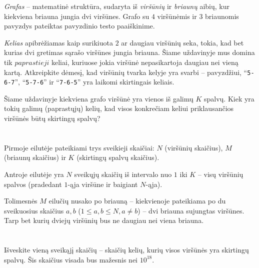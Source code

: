 \ifx\boi\undefined\fi
\def\version{jury-1}
{\em Grafas} -- matematinė struktūra, sudaryta iš {\em viršūnių} ir {\em briaunų} aibių, kur kiekviena briauna jungia dvi viršūnes. Grafo su $4$ viršūnėmis ir $3$ briaunomis pavyzdys pateiktas pavyzdinio testo paaiškinime.

{\em Kelias} apibrėžiamas kaip surikiuota $2$ ar daugiau viršūnių seka, tokia, kad bet kurias dvi gretimas sąrašo viršūnes jungia briauna. Šiame uždavinyje mus domina tik $paprastieji$ keliai, kuriuose jokia viršūnė nepasikartoja daugiau nei vieną kartą. Atkreipkite dėmesį, kad viršūnių tvarka kelyje yra svarbi -- pavyzdžiui, ``\texttt{5-6-7}'', ``\texttt{5-7-6}'' ir ``\texttt{7-6-5}'' yra laikomi skirtingais keliais.

Šiame uždavinyje kiekviena grafo viršūnė yra vienos iš galimų $K$ spalvų. Kiek yra tokių galimų (paprastųjų) kelių, kad visos konkrečiam keliui priklausančios viršūnės būtų skirtingų spalvų?




\section*{}
Pirmoje eilutėje pateikiami trys sveikieji skaičiai: $N$ (viršūnių skaičius), $M$ (briaunų skaičius) ir $K$ (skirtingų spalvų skaičius).


Antroje eilutėje yra $N$ sveikųjų skaičių iš intervalo nuo $1$ iki $K$ -- visų viršūnių spalvos (pradedant $1$-ąja viršūne ir baigiant $N$-ąja). 

Tolimesnės $M$ eilučių nusako po briauną -- kiekvienoje pateikiama po du sveikuosius skaičius $a, b$ ($1 \le a, b \le N, a \neq b$) -- dvi briauna sujungtas viršūnes. Tarp bet kurių dviejų viršūnių bus ne daugiau nei viena briauna.

\section*{\outputsection}
Išveskite vieną sveikąjį skaičių -- skaičių kelių, kurių visos viršūnės yra skirtingų spalvų. Šis skaičius visada bus mažesnis nei $10^{18}$.

\section*{\constraints}
\testgroups

